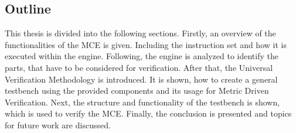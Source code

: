 \subsection{Outline}

This thesis is divided into the following sections.
Firstly, an overview of the functionalities of the MCE is given. Including the instruction set and how it is executed within the engine.
Following, the engine is analyzed to identify the parts, that have to be considered for verification.
After that, the Universal Verification Methodology is introduced. It is shown, how to create a general testbench using the provided components and its usage for
Metric Driven Verification.
Next, the structure and functionality of the testbench is shown, which is used to verify the MCE.
Finally, the conclusion is presented and topics for future work are discussed.
